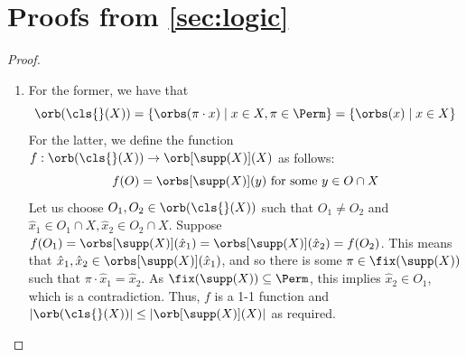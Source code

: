 \newpage
\appendix
\section{Proofs from \cref{sec:logic}}
\nomlemma*

\begin{proof}
	\begin{enumerate}
	\item For the former, we have that 
	$$\orb(\cls{}(X)) = \{\orbs(\pi\cdot x) \mid x \in X, \pi \in \Perm\} = \{\orbs(x) \mid x \in X\}$$
	For the latter, we define the function $f: \orb(\cls{}(X)) \to \orb[\supp(X)](X)$ as follows:
	\[
	f(O) = \orbs[\supp(X)](y) \text{ for some } y \in O \cap X
	\]
	Let us choose $O_1, O_2 \in \orb(\cls{}(X))$ such that $O_1 \neq O_2$ and $\hat x_1 \in O_1 \cap X, \hat x_2 \in O_2 \cap X$.
	Suppose $f(O_1) = \orbs[\supp(X)](\hat x_1) = \orbs[\supp(X)](\hat x_2) = f(O_2)$. 
	This means that $\hat x_1, \hat x_2 \in \orbs[\supp(X)](\hat x_1)$,
	and so there is some $\pi \in \fix(\supp(X))$ such that $\pi \cdot \hat x_1 = \hat x_2$. 
	As $\fix(\supp(X)) \subseteq \Perm$, this implies $\hat x_2 \in O_1$, which is a contradiction. 
	Thus, $f$ is a 1-1 function and $|\orb(\cls{}(X))| \le |\orb[\supp(X)](X)|$ as required.	
	

\end{enumerate}
\end{proof}
